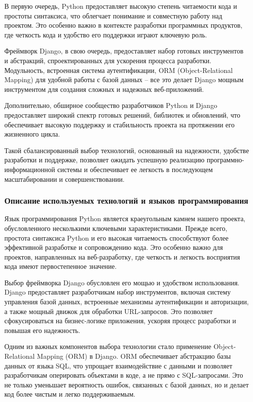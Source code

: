 В первую очередь, Python предоставляет высокую степень читаемости кода и простоты синтаксиса, что облегчает понимание и совместную работу над проектом. Это особенно важно в контексте разработки программных продуктов, где четкость кода и удобство его поддержки играют ключевую роль.

Фреймворк Django, в свою очередь, предоставляет набор готовых инструментов и абстракций, спроектированных для ускорения процесса разработки. Модульность, встроенная система аутентификации, ORM (Object-Relational Mapping) для удобной работы с базой данных – все это делает Django мощным инструментом для создания сложных и надежных веб-приложений.

Дополнительно, обширное сообщество разработчиков Python и Django предоставляет широкий спектр готовых решений, библиотек и обновлений, что обеспечивает высокую поддержку и стабильность проекта на протяжении его жизненного цикла.

Такой сбалансированный выбор технологий, основанный на надежности, удобстве разработки и поддержке, позволяет ожидать успешную реализацию программно-информационной системы и обеспечивает ее легкость в последующем масштабировании и совершенствовании.

\subsubsection{Описание используемых технологий и языков программирования}

Язык программирования Python является краеугольным камнем нашего проекта, обусловленного несколькими ключевыми характеристиками. Прежде всего, простота синтаксиса Python и его высокая читаемость способствуют более эффективной разработке и сопровождению кода. Это особенно важно для проектов, направленных на веб-разработку, где четкость и легкость восприятия кода имеют первостепенное значение.

Выбор фреймворка Django обусловлен его мощью и удобством использования. Django предоставляет разработчикам набор инструментов, включая систему управления базой данных, встроенные механизмы аутентификации и авторизации, а также мощный движок для обработки URL-запросов. Это позволяет сфокусироваться на бизнес-логике приложения, ускоряя процесс разработки и повышая его надежность.

Одним из важных компонентов выбора технологии стало применение Object-Relational Mapping (ORM) в Django. ORM обеспечивает абстракцию базы данных от языка SQL, что упрощает взаимодействие с данными и позволяет разработчикам оперировать объектами в коде, а не прямо с SQL-запросами. Это не только уменьшает вероятность ошибок, связанных с базой данных, но и делает код более чистым и легко поддерживаемым.

